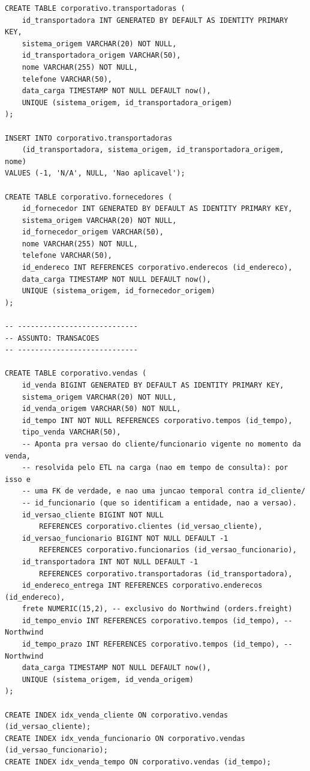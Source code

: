 {\begin{verbatim}
CREATE TABLE corporativo.transportadoras (
    id_transportadora INT GENERATED BY DEFAULT AS IDENTITY PRIMARY KEY,
    sistema_origem VARCHAR(20) NOT NULL,
    id_transportadora_origem VARCHAR(50),
    nome VARCHAR(255) NOT NULL,
    telefone VARCHAR(50),
    data_carga TIMESTAMP NOT NULL DEFAULT now(),
    UNIQUE (sistema_origem, id_transportadora_origem)
);

INSERT INTO corporativo.transportadoras
    (id_transportadora, sistema_origem, id_transportadora_origem, nome)
VALUES (-1, 'N/A', NULL, 'Nao aplicavel');

CREATE TABLE corporativo.fornecedores (
    id_fornecedor INT GENERATED BY DEFAULT AS IDENTITY PRIMARY KEY,
    sistema_origem VARCHAR(20) NOT NULL,
    id_fornecedor_origem VARCHAR(50),
    nome VARCHAR(255) NOT NULL,
    telefone VARCHAR(50),
    id_endereco INT REFERENCES corporativo.enderecos (id_endereco),
    data_carga TIMESTAMP NOT NULL DEFAULT now(),
    UNIQUE (sistema_origem, id_fornecedor_origem)
);

-- ----------------------------
-- ASSUNTO: TRANSACOES
-- ----------------------------

CREATE TABLE corporativo.vendas (
    id_venda BIGINT GENERATED BY DEFAULT AS IDENTITY PRIMARY KEY,
    sistema_origem VARCHAR(20) NOT NULL,
    id_venda_origem VARCHAR(50) NOT NULL,
    id_tempo INT NOT NULL REFERENCES corporativo.tempos (id_tempo),
    tipo_venda VARCHAR(50),
    -- Aponta pra versao do cliente/funcionario vigente no momento da venda,
    -- resolvida pelo ETL na carga (nao em tempo de consulta): por isso e
    -- uma FK de verdade, e nao uma juncao temporal contra id_cliente/
    -- id_funcionario (que so identificam a entidade, nao a versao).
    id_versao_cliente BIGINT NOT NULL
        REFERENCES corporativo.clientes (id_versao_cliente),
    id_versao_funcionario BIGINT NOT NULL DEFAULT -1
        REFERENCES corporativo.funcionarios (id_versao_funcionario),
    id_transportadora INT NOT NULL DEFAULT -1
        REFERENCES corporativo.transportadoras (id_transportadora),
    id_endereco_entrega INT REFERENCES corporativo.enderecos (id_endereco),
    frete NUMERIC(15,2), -- exclusivo do Northwind (orders.freight)
    id_tempo_envio INT REFERENCES corporativo.tempos (id_tempo), -- Northwind
    id_tempo_prazo INT REFERENCES corporativo.tempos (id_tempo), -- Northwind
    data_carga TIMESTAMP NOT NULL DEFAULT now(),
    UNIQUE (sistema_origem, id_venda_origem)
);

CREATE INDEX idx_venda_cliente ON corporativo.vendas (id_versao_cliente);
CREATE INDEX idx_venda_funcionario ON corporativo.vendas (id_versao_funcionario);
CREATE INDEX idx_venda_tempo ON corporativo.vendas (id_tempo);


\end{verbatim}}
